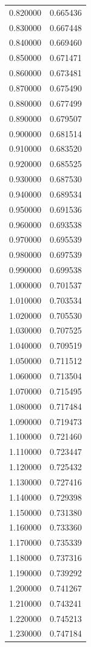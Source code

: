 \begin{tabular}{rr}
0.820000 & 0.665436 \\
0.830000 & 0.667448 \\
0.840000 & 0.669460 \\
0.850000 & 0.671471 \\
0.860000 & 0.673481 \\
0.870000 & 0.675490 \\
0.880000 & 0.677499 \\
0.890000 & 0.679507 \\
0.900000 & 0.681514 \\
0.910000 & 0.683520 \\
0.920000 & 0.685525 \\
0.930000 & 0.687530 \\
0.940000 & 0.689534 \\
0.950000 & 0.691536 \\
0.960000 & 0.693538 \\
0.970000 & 0.695539 \\
0.980000 & 0.697539 \\
0.990000 & 0.699538 \\
1.000000 & 0.701537 \\
1.010000 & 0.703534 \\
1.020000 & 0.705530 \\
1.030000 & 0.707525 \\
1.040000 & 0.709519 \\
1.050000 & 0.711512 \\
1.060000 & 0.713504 \\
1.070000 & 0.715495 \\
1.080000 & 0.717484 \\
1.090000 & 0.719473 \\
1.100000 & 0.721460 \\
1.110000 & 0.723447 \\
1.120000 & 0.725432 \\
1.130000 & 0.727416 \\
1.140000 & 0.729398 \\
1.150000 & 0.731380 \\
1.160000 & 0.733360 \\
1.170000 & 0.735339 \\
1.180000 & 0.737316 \\
1.190000 & 0.739292 \\
1.200000 & 0.741267 \\
1.210000 & 0.743241 \\
1.220000 & 0.745213 \\
1.230000 & 0.747184 \\

\end{tabular}
